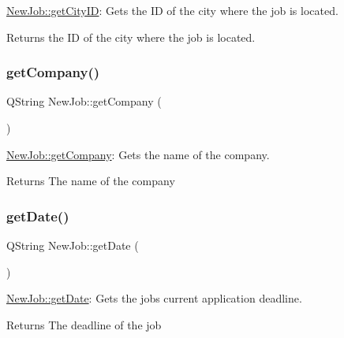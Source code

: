 \hyperlink{class_new_job_aed4a9a6fa7eab69062c1d36afd58cd75}{New\+Job\+::get\+City\+ID}\+: Gets the ID of the city where the job is located. 

\begin{DoxyReturn}{Returns}
the ID of the city where the job is located. 
\end{DoxyReturn}
\mbox{\label{class_new_job_ad4680ae9c009b90ce751c3c5fe60cdb5}} 
\subsubsection{\texorpdfstring{get\+Company()}{getCompany()}}
{\footnotesize\ttfamily Q\+String New\+Job\+::get\+Company (\begin{DoxyParamCaption}{ }\end{DoxyParamCaption})}



\hyperlink{class_new_job_ad4680ae9c009b90ce751c3c5fe60cdb5}{New\+Job\+::get\+Company}\+: Gets the name of the company. 

\begin{DoxyReturn}{Returns}
The name of the company 
\end{DoxyReturn}
\mbox{\label{class_new_job_abe92b6bce4e8e3485f59554a2cbad1bc}} 
\subsubsection{\texorpdfstring{get\+Date()}{getDate()}}
{\footnotesize\ttfamily Q\+String New\+Job\+::get\+Date (\begin{DoxyParamCaption}{ }\end{DoxyParamCaption})}



\hyperlink{class_new_job_abe92b6bce4e8e3485f59554a2cbad1bc}{New\+Job\+::get\+Date}\+: Gets the job\textquotesingle{}s current application deadline. 

\begin{DoxyReturn}{Returns}
The deadline of the job 
\end{DoxyReturn}
\mbox{\label{class_new_job_a665113a114684439ed3705c8c5f8eabf}} 
